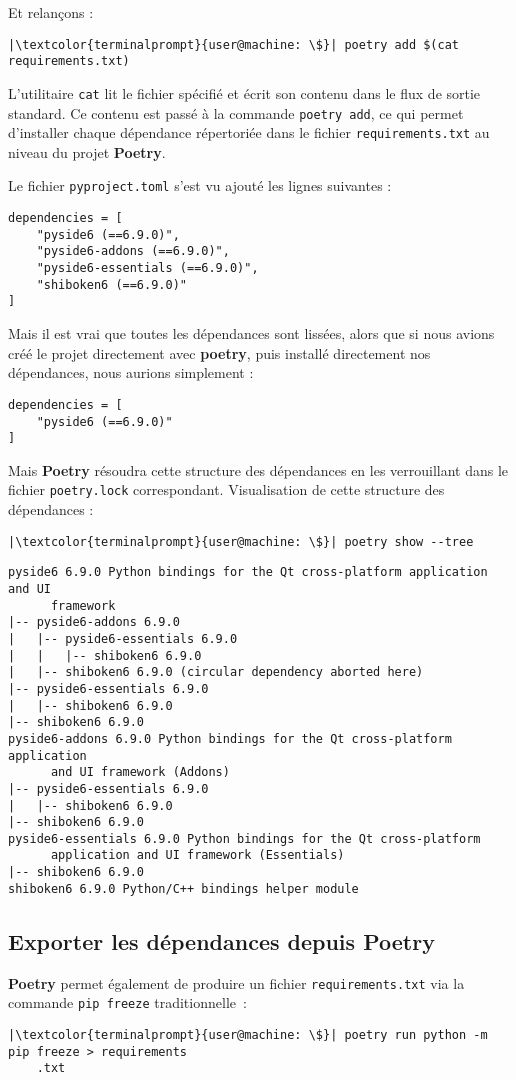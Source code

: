Et relançons :
\begin{lstlisting}[style=terminal]
|\textcolor{terminalprompt}{user@machine: \$}| poetry add $(cat requirements.txt)
\end{lstlisting}

L’utilitaire \texttt{cat} lit le fichier spécifié et écrit son contenu dans le flux de sortie standard. Ce contenu est passé à la commande \texttt{poetry add}, ce qui permet d'installer chaque dépendance répertoriée dans le fichier \texttt{requirements.txt} au niveau du projet \textbf{Poetry}.

Le fichier \texttt{pyproject.toml} s'est vu ajouté les lignes suivantes :
\begin{verbatim}
dependencies = [
    "pyside6 (==6.9.0)",
    "pyside6-addons (==6.9.0)",
    "pyside6-essentials (==6.9.0)",
    "shiboken6 (==6.9.0)"
]
\end{verbatim}

Mais il est vrai que toutes les dépendances sont lissées, alors que si nous avions créé le projet directement avec \textbf{poetry}, puis installé directement nos dépendances, nous aurions simplement :
\begin{verbatim}
dependencies = [
    "pyside6 (==6.9.0)"
]
\end{verbatim}

Mais \textbf{Poetry} résoudra cette structure des dépendances en les verrouillant dans le fichier \texttt{poetry.lock} correspondant. Visualisation de cette structure des dépendances :
\begin{lstlisting}[style=terminal]
|\textcolor{terminalprompt}{user@machine: \$}| poetry show --tree
\end{lstlisting}
\begin{verbatim}
pyside6 6.9.0 Python bindings for the Qt cross-platform application and UI 
      framework
|-- pyside6-addons 6.9.0
|   |-- pyside6-essentials 6.9.0
|   |   |-- shiboken6 6.9.0
|   |-- shiboken6 6.9.0 (circular dependency aborted here)
|-- pyside6-essentials 6.9.0
|   |-- shiboken6 6.9.0
|-- shiboken6 6.9.0
pyside6-addons 6.9.0 Python bindings for the Qt cross-platform application 
      and UI framework (Addons)
|-- pyside6-essentials 6.9.0
|   |-- shiboken6 6.9.0
|-- shiboken6 6.9.0
pyside6-essentials 6.9.0 Python bindings for the Qt cross-platform 
      application and UI framework (Essentials)
|-- shiboken6 6.9.0
shiboken6 6.9.0 Python/C++ bindings helper module
\end{verbatim}

\subsection*{Exporter les dépendances depuis \textbf{Poetry}}
\textbf{Poetry} permet également de produire un fichier \texttt{requirements.txt} via la commande \texttt{pip freeze} traditionnelle :
\begin{lstlisting}[style=terminal]
|\textcolor{terminalprompt}{user@machine: \$}| poetry run python -m pip freeze > requirements
    .txt
\end{lstlisting}

